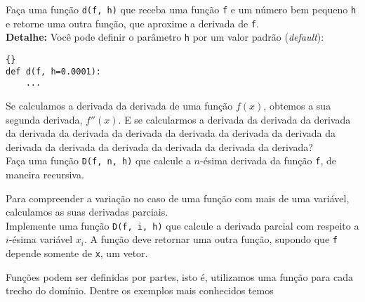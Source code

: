 	\quest Faça uma função \texttt{d(f, h)} que receba uma função \texttt{f} e um número bem pequeno \texttt{h} e retorne uma outra função, que aproxime a derivada de \texttt{f}.\\
	
	\textbf{Detalhe:} Você pode definir o parâmetro \texttt{h} por um valor padrão (\textit{default}):
	
	\begin{lstlisting}{}
def d(f, h=0.0001):
	...
	\end{lstlisting}
	
	
	Se calculamos a derivada da derivada de uma função $f(x)$, obtemos a sua segunda derivada, $f''(x)$. E se calcularmos a derivada da derivada da derivada da derivada da derivada da derivada da derivada da derivada da derivada da derivada da derivada da derivada da derivada da derivada da derivada?\\
	
	\quest Faça uma função \texttt{D(f, n, h)} que calcule a $n$-ésima derivada da função \texttt{f}, de maneira recursiva.
	
	
	Para compreender a variação no caso de uma função com mais de uma variável, calculamos as suas derivadas parciais.\\
	
	\quest Implemente uma função \texttt{D(f, i, h)} que calcule a derivada parcial com respeito a $i$-ésima variável $x_i$. A função deve retornar uma outra função, supondo que \texttt{f} depende somente de \texttt{x}, um vetor.
	
	
	
	Funções podem ser definidas por partes, isto é, utilizamos uma função para cada trecho do domínio. Dentre os exemplos mais conhecidos temos

